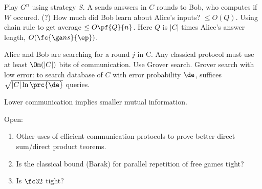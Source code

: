 Play $G^n$ using strategy $S$. A sends answers in $C$ rounds to Bob, who computes if $W$ occured. (?) How much did Bob learn about Alice's inputs? $\le O(Q)$. Using chain rule to get average $\le O\pf{Q}{n}$. Here $Q$ is $|C|$ times Alice's answer length, $O(\fc{\ga n s}{\ep})$.

Alice and Bob are searching for a round $j$ in C. Any classical protocol must use at least $\Om(|C|)$ bits of communication. Use Grover search.
Grover search with low error: to search database of $C$ with error probability $\de$, suffices $\sqrt{|C|\ln \prc{\de}}$ queries. 

Lower communication implies smaller mutual information.

Open:
\begin{enumerate}
\item
Other uses of efficient communication protocols to prove better direct sum/direct product teorems.
\item Is the classical bound (Barak) for parallel repetition of free games tight?
\item Is $\fc 32$ tight?
\end{enumerate}

